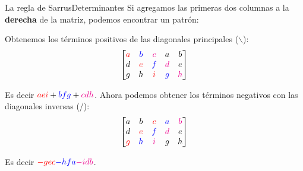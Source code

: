 \documentclass[spanish, c]{beamer}
\begin{document}
\begin{frame}{La regla de Sarrus}{Determinantes}
    Si agregamos las \alert{primeras dos columnas} a la \textbf{derecha} de la matriz, podemos encontrar un patrón: \pause

    Obtenemos los términos positivos de las \alert{diagonales principales} ($\backslash$):
    $$\begin{bmatrix}
        \color{red} a & \color{blue} b & \color{magenta} c & a & b \\
        d & \color{red} e & \color{blue} f & \color{magenta} d & e \\
        g & h & \color{red} i & \color{blue} g & \color{magenta} h
    \end{bmatrix}$$

    Es decir ${\color{red} aei} + {\color{blue} bfg} + {\color{magenta} cdh}$. Ahora podemos obtener los términos negativos con las \alert{diagonales inversas} (/):
    $$\begin{bmatrix}
        a & b & \color{red} c & \color{blue} a & \color{magenta} b \\
        d & \color{red} e & \color{blue} f & \color{magenta} d & e \\
        \color{red} g & \color{blue} h & \color{magenta} i & g & h
    \end{bmatrix}$$
    
    Es decir ${\color{red} -gec} {\color{blue} -hfa} {\color{magenta} -idb}$.
\end{frame}





\end{document}

